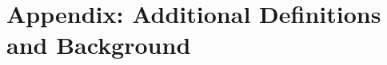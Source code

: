 \documentclass{article}
\newtheorem{definition}{Definition}
\newtheorem{theorem}{Theorem}
\newcommand{\CM}{\mathcal{M}}
\newcommand{\BR}{\mathbb{R}}
\newcommand{\rd}{\mathrm{d}}
\begin{document}




\section{Appendix: Additional Definitions and Background}\label{s:add}
\end{document}
